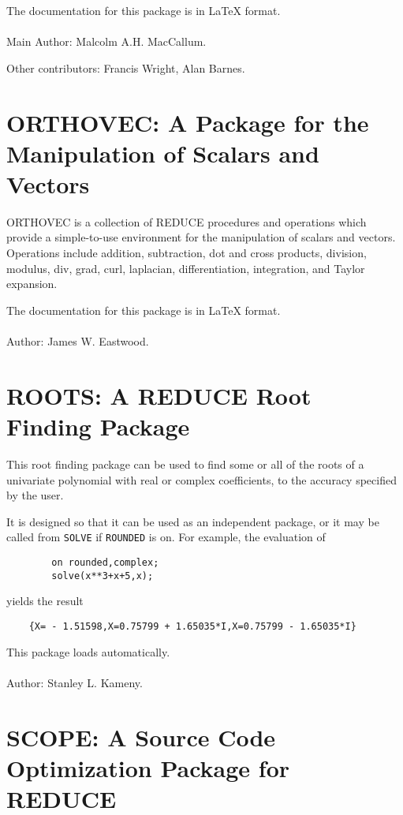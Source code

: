 The documentation for this package is in {\LaTeX} format.
\\ \\
Main Author: Malcolm A.H. MacCallum.

Other contributors: Francis Wright, Alan Barnes.

\section{ORTHOVEC: A Package for the Manipulation of Scalars and Vectors}

ORTHOVEC is a collection of REDUCE procedures and operations which
provide a simple-to-use environment for the manipulation of scalars and
vectors.  Operations include addition, subtraction, dot and cross
products, division, modulus, div, grad, curl, laplacian, differentiation,
integration, and Taylor expansion.

The documentation for this package is in {\LaTeX} format.
\\ \\
Author: James W. Eastwood.

\section{ROOTS: A REDUCE Root Finding Package} 

This root finding package can be used to find some or all of the roots of a
univariate polynomial with real or complex coefficients, to the accuracy
specified by the user.

It is designed so that it can be used as an independent package, or it may
be called from {\tt SOLVE} if {\tt ROUNDED} is on. For example,
the evaluation of
\begin{verbatim}
        on rounded,complex;
        solve(x**3+x+5,x);
\end{verbatim}
yields the result
\begin{verbatim}
    {X= - 1.51598,X=0.75799 + 1.65035*I,X=0.75799 - 1.65035*I}
\end{verbatim}

This package loads automatically.
\\ \\
Author: Stanley L. Kameny.

\section{SCOPE: A Source Code Optimization Package for REDUCE}

